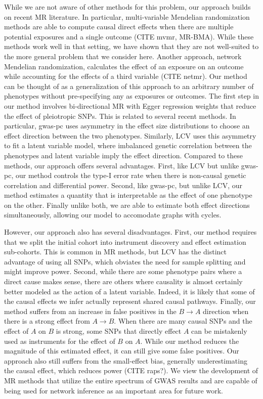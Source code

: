 \documentclass{article}
\begin{document}
While we are not aware of other methods for this problem, our approach
builds on recent MR literature. In particular, multi-variable Mendelian
randomization methods are able to compute causal direct effects when there
are multiple potential exposures and a single outcome (CITE mvmr, MR-BMA). While
these methods work well in that setting, we have shown that they are not well-suited
to the more general problem that we consider here. Another approach, network
Mendelian randomization, calculates the effect of an exposure on an outcome while
accounting for the effects of a third variable (CITE netmr). Our method can
be thought of as a generalization of this approach to an arbitrary number of phenotypes
without pre-specifying any as exposures or outcomes. The first step in our method
involves bi-directional MR with Egger regression weights that reduce the effect
of pleiotropic SNPs. This is related to several recent methods.
In particular, gwas-pc uses asymmetry in the effect size distributions
to choose an effect direction between the two phenotypes. Similarly, 
LCV uses this asymmetry to fit a latent variable model, where imbalanced
genetic correlation between the phenotypes and latent variable imply
the effect direction. Compared to these methods, our approach offers several
advantages. First, like LCV but unlike gwas-pc, our method controls the type-I error rate
when there is non-causal genetic correlation and differential power. Second, like gwas-pc,
but unlike LCV, our method estimates a quantity that is interpretable as the
effect of one phenotype on the other. Finally unlike both,
we are able to estimate both effect directions simultaneously, allowing our
model to accomodate graphs with cycles.

However, our approach also has several disadvantages. First, our method
requires that we split the initial cohort into instrument discovery and
effect estimation sub-cohorts. This is common in MR methods, but LCV has
the distinct advantage of using all SNPs, which obviates the need
for sample splitting and might improve power. Second, while there are some
phenotype pairs where a direct cause makes sense, there are others where causality is 
almost certainly better modeled as the action of a latent variable. Indeed, it is likely
that some of the causal effects we infer actually represent shared causal pathways.
Finally, our method suffers from an increase in false positives in the $B\rightarrow A$
direction when there is a strong effect from $A\rightarrow B$. When there are many
causal SNPs and the effect of $A$ on $B$ is strong, some SNPs that directly effect $A$
can be mistakenly used as instruments for the effect of $B$ on $A$. While our method
reduces the magnitude of this estimated effect, it can still give some false positives.
Our approach also still suffers from the small-effect bias, generally underestimating
the causal effect, which reduces power (CITE raps?).
We view the development of MR methods that utilize the entire spectrum of GWAS results and are
capable of being used for network inference as an important
area for future work.
\end{document}

